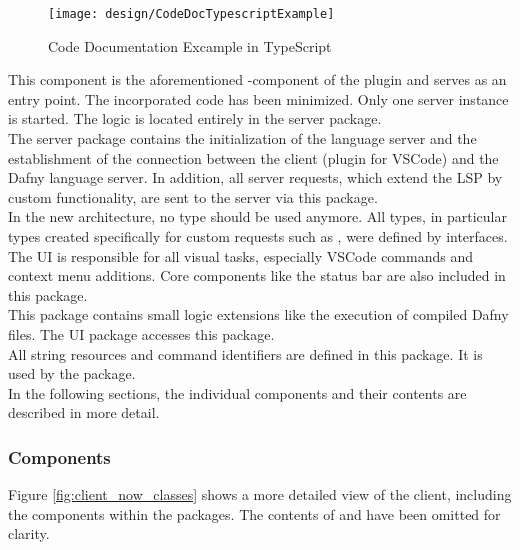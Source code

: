 \begin{figure}[H]
    \centering
    \texttt{[image: design/CodeDocTypescriptExample]}
    \caption{Code Documentation Excample in TypeScript}
    \label{fig:CodeDocTypescriptExample}
\end{figure}

{\bf {}} \textendash{}
This component is the aforementioned -component of the plugin and serves as an entry point.
The incorporated code has been minimized.
Only one server instance is started.
The logic is located entirely in the server package.\\

{\bf {}} \textendash{}
The server package contains the initialization of the language server and the establishment of the connection between the client (plugin for VSCode) and the Dafny language server.
In addition, all server requests, which extend the LSP by custom functionality, are sent to the server via this package.\\

{\bf {}} \textendash{}
In the new architecture, no  type should be used anymore.
All types, in particular types created specifically for custom requests such as , were defined by interfaces. \\

{\bf {}} \textendash{}
The UI is responsible for all visual tasks, especially VSCode commands and context menu additions.
Core components like the status bar are also included in this package.\\

{\bf {}} \textendash{}
This package contains small logic extensions like the execution of compiled Dafny files.
The UI package accesses this package.\\

{\bf {}} \textendash{}
All string resources and command identifiers are defined in this package.
It is used by the  package. \\

In the following sections, the individual components and their contents are described in more detail.

\subsubsection{Components}
Figure \ref{fig:client_now_classes} shows a more detailed view of the client, including the components within the packages.
The contents of  and  have been omitted for clarity.\\

